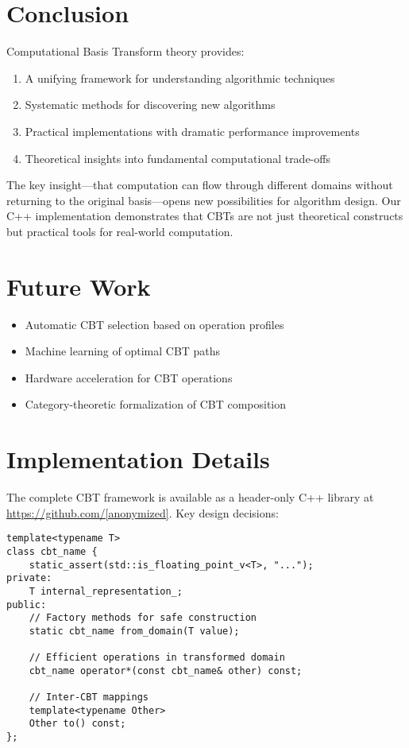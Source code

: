 \documentclass[12pt,a4paper]{article}
\theoremstyle{definition}
\begin{document}
\section{Conclusion}

Computational Basis Transform theory provides:
\begin{enumerate}
\item A unifying framework for understanding algorithmic techniques
\item Systematic methods for discovering new algorithms
\item Practical implementations with dramatic performance improvements
\item Theoretical insights into fundamental computational trade-offs
\end{enumerate}

The key insight—that computation can flow through different domains without returning to the original basis—opens new possibilities for algorithm design. Our C++ implementation demonstrates that CBTs are not just theoretical constructs but practical tools for real-world computation.

\section{Future Work}

\begin{itemize}
\item Automatic CBT selection based on operation profiles
\item Machine learning of optimal CBT paths
\item Hardware acceleration for CBT operations
\item Category-theoretic formalization of CBT composition
\end{itemize}




\appendix

\section{Implementation Details}

The complete CBT framework is available as a header-only C++ library at \url{https://github.com/[anonymized]}. Key design decisions:

\begin{lstlisting}[caption={CBT design pattern}]
template<typename T>
class cbt_name {
    static_assert(std::is_floating_point_v<T>, "...");
private:
    T internal_representation_;
public:
    // Factory methods for safe construction
    static cbt_name from_domain(T value);
    
    // Efficient operations in transformed domain
    cbt_name operator*(const cbt_name& other) const;
    
    // Inter-CBT mappings
    template<typename Other>
    Other to() const;
};
\end{lstlisting}
\end{document}
